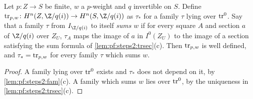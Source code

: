 \begin{lemma}\label{lem:pf:steps2:trchar}
Let $p\colon Z\to S$ be finite, $w$ a $p$-weight and $q$ invertible on $S$. Define
$\stepsiitr_{p,w}\colon H^n(Z,\Z/q(i))\to H^n(S,\Z/q(i))$ as $\tau_\ast$ for a family $\tau$ lying over
$\mathrm{tr}^0$. Say that a family $\tau$ from $I_{\Z/q(i)}$ to itself \emph{sums $w$} if for every square
$A$ and section $a$ of $\Z/q(i)$ over $Z_U$, $\tau_A$ maps the image of $a$ in $I^0(Z_U)$ to the image
of a section satisfying the sum formula of \cref{lem:pf:steps2:trsec}(c). Then $\mathrm{tr}_{p,w}$ is
well defined, and $\tau_\ast=\mathrm{tr}_{p,w}$ for every family $\tau$ which sums $w$.
\end{lemma}

\begin{proof}
A family lying over $\mathrm{tr}^0$ exists and $\tau_\ast$ does not depend on it, by
\cref{lem:pf:steps2:fam}(c). A family which sums $w$ lies over $\mathrm{tr}^0$, by the uniqueness in
\cref{lem:pf:steps2:trsec}(c).
\end{proof}

